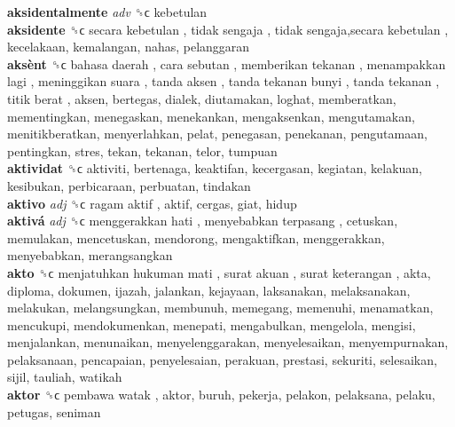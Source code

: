 \textbf{aksidentalmente} \emph{adv}  ␝ϲ  kebetulan  \\
\textbf{aksidente} ␝ϲ   secara kebetulan ,  tidak sengaja ,  tidak sengaja,secara kebetulan , kecelakaan, kemalangan, nahas, pelanggaran  \\
\textbf{aksènt} ␝ϲ   bahasa daerah ,  cara sebutan ,  memberikan tekanan ,  menampakkan lagi ,  meninggikan suara ,  tanda aksen ,  tanda tekanan bunyi ,  tanda tekanan ,  titik berat , aksen, bertegas, dialek, diutamakan, loghat, memberatkan, mementingkan, menegaskan, menekankan, mengaksenkan, mengutamakan, menitikberatkan, menyerlahkan, pelat, penegasan, penekanan, pengutamaan, pentingkan, stres, tekan, tekanan, telor, tumpuan  \\
\textbf{aktividat} ␝ϲ  aktiviti, bertenaga, keaktifan, kecergasan, kegiatan, kelakuan, kesibukan, perbicaraan, perbuatan, tindakan  \\
\textbf{aktivo} \emph{adj}  ␝ϲ   ragam aktif , aktif, cergas, giat, hidup  \\
\textbf{aktivá} \emph{adj}  ␝ϲ   menggerakkan hati ,  menyebabkan terpasang , cetuskan, memulakan, mencetuskan, mendorong, mengaktifkan, menggerakkan, menyebabkan, merangsangkan  \\
\textbf{akto} ␝ϲ   menjatuhkan hukuman mati ,  surat akuan ,  surat keterangan , akta, diploma, dokumen, ijazah, jalankan, kejayaan, laksanakan, melaksanakan, melakukan, melangsungkan, membunuh, memegang, memenuhi, menamatkan, mencukupi, mendokumenkan, menepati, mengabulkan, mengelola, mengisi, menjalankan, menunaikan, menyelenggarakan, menyelesaikan, menyempurnakan, pelaksanaan, pencapaian, penyelesaian, perakuan, prestasi, sekuriti, selesaikan, sijil, tauliah, watikah  \\
\textbf{aktor} ␝ϲ   pembawa watak , aktor, buruh, pekerja, pelakon, pelaksana, pelaku, petugas, seniman  \\
